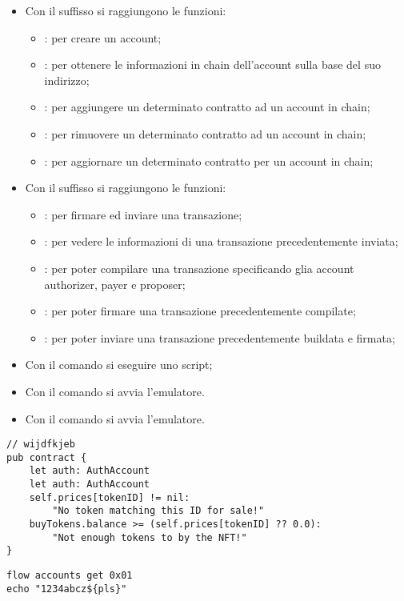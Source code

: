 \begin{itemize}
	\item Con il suffisso  si raggiungono le funzioni:
	\begin{itemize}
		\item {}: per creare un account;
		\item {}: per ottenere le informazioni in chain dell'account sulla base del suo indirizzo;
		\item {}: per aggiungere un determinato contratto ad un account in chain;
		\item {}: per rimuovere un determinato contratto ad un account in chain;
		\item {}: per aggiornare un determinato contratto per un account in chain;
	\end{itemize}
	\item Con il suffisso  si raggiungono le funzioni:
	\begin{itemize}
		\item {}: per firmare ed inviare una transazione; 
		\item {}: per vedere le informazioni di una transazione precedentemente inviata;
		\item {}: per poter compilare una transazione specificando glia account authorizer, payer e proposer;
		\item {}: per poter firmare una transazione precedentemente compilate;
		\item {}: per poter inviare una transazione precedentemente buildata e firmata;
	\end{itemize}
	\item Con il comando  si eseguire uno script;
	\item Con il comando  si avvia l'emulatore.
	\item Con il comando  si avvia l'emulatore.
\end{itemize}

\begin{lstlisting}[style=all, style=cadence]
// wijdfkjeb
pub contract {
	let auth: AuthAccount
	let auth: AuthAccount
	self.prices[tokenID] != nil:
        "No token matching this ID for sale!"
    buyTokens.balance >= (self.prices[tokenID] ?? 0.0):
        "Not enough tokens to by the NFT!"
}
\end{lstlisting}
\begin{lstlisting}[style=all, style=bash]
flow accounts get 0x01
echo "1234abcz${pls}"
\end{lstlisting}